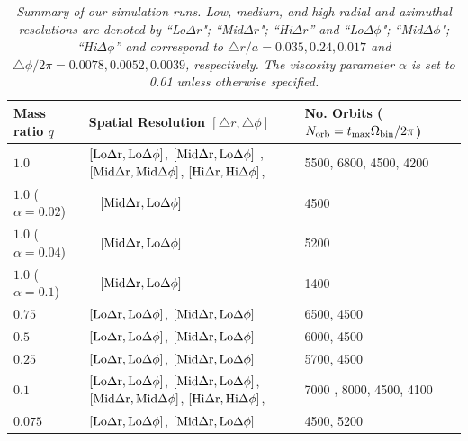 \begin{table}
\begin{center}
\caption{\em Summary of our simulation runs. Low, medium, and high radial and
azimuthal resolutions are denoted by ``Lo$\Delta r$"; ``Mid$\Delta r$";  ``Hi$\Delta r$'' 
and ``Lo$\Delta\phi$"; ``Mid$\Delta\phi$";  ``Hi$\Delta\phi$''  and correspond to 
$\triangle r/a = 0.035, 0.24, 0.017$ and $\triangle \phi/2\pi = 0.0078, 0.0052, 0.0039$, respectively. 
The viscosity parameter $\alpha$ is set to 0.01 unless otherwise specified.}
\label{Tbl_simruns}
\begin{tabular}{   l   |    l   |   l    }
  Mass ratio $q$    &   Spatial Resolution $\left[\triangle r, \triangle \phi \right]$  &  No. Orbits ($N_{\rm orb}=t_{\rm max} \Omega_{\rm bin}/2\pi$)\\ \hline
  $1.0$    &    $\left[\rm{Lo}\Delta r, \rm{Lo}\Delta \phi \right]$,  $\left[\rm{Mid}\Delta r , \rm{Lo}\Delta \phi \right]$    ,  $\left[\rm{\rm{Mid}\Delta r}, \rm{Mid}\Delta \phi \right]$,    $\left[\rm{\rm{Hi}\Delta r}, \rm{Hi}\Delta \phi \right]$,  &  5500, 6800, 4500, 4200       \\ 
  $1.0$ ($\alpha=0.02$)   &     \hbox{  } \qquad  \qquad \qquad   $\left[\rm{Mid}\Delta r , \rm{Lo}\Delta \phi \right]$    &  4500      \\ 
   $1.0$ ($\alpha=0.04$)   &    \hbox{  } \qquad  \qquad \qquad   $\left[\rm{Mid}\Delta r , \rm{Lo}\Delta \phi \right]$    &  5200      \\ 
    $1.0$ ($\alpha=0.1$)   &    \hbox{  } \qquad  \qquad \qquad   $\left[\rm{Mid}\Delta r , \rm{Lo}\Delta \phi \right]$    &  1400      \\ 
  $0.75$  &   $\left[\rm{Lo}\Delta r, \rm{Lo}\Delta \phi \right]$,  $\left[\rm{Mid}\Delta r, \rm{Lo}\Delta \phi \right]$      &  6500, 4500    \\ 
  $0.5$    &   $\left[\rm{Lo}\Delta r, \rm{Lo}\Delta \phi \right]$,  $\left[\rm{Mid}\Delta r, \rm{Lo}\Delta \phi \right]$      &  6000, 4500   \\ 
  $0.25$  &  $\left[\rm{Lo}\Delta r, \rm{Lo}\Delta \phi \right]$,  $\left[\rm{Mid}\Delta r, \rm{Lo}\Delta \phi \right]$       &  5700, 4500   \\ 
    $0.1$    &   $\left[\rm{Lo}\Delta r, \rm{Lo}\Delta \phi \right]$,  $\left[\rm{Mid}\Delta r, \rm{Lo}\Delta \phi \right]$,  $\left[\rm{\rm{Mid}\Delta r}, \rm{Mid}\Delta \phi \right]$,    $\left[\rm{\rm{Hi}\Delta r}, \rm{Hi}\Delta \phi \right]$,  &7000 , 8000, 4500, 4100     \\ 
   $0.075$    &   $\left[\rm{Lo}\Delta r, \rm{Lo}\Delta \phi \right]$,  $\left[\rm{Mid}\Delta r, \rm{Lo}\Delta \phi \right]$      &  4500, 5200       \\ 

\end{tabular}
\end{center}
\end{table}
